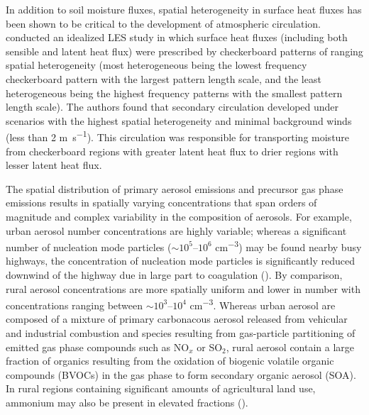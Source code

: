 In addition to soil moisture fluxes, spatial heterogeneity in surface heat fluxes has been shown to be critical to the development of atmospheric circulation. \cite{lee_effect_2019} conducted an idealized LES study in which surface heat fluxes (including both sensible and latent heat flux) were prescribed by checkerboard patterns of ranging spatial heterogeneity (most heterogeneous being the lowest frequency checkerboard pattern with the largest pattern length scale, and the least heterogeneous being the highest frequency patterns with the smallest pattern length scale). The authors found that secondary circulation developed under scenarios with the highest spatial heterogeneity and minimal background winds (less than 2 \si{m.s^{-1}}). This circulation was responsible for transporting moisture from checkerboard regions with greater latent heat flux to drier regions with lesser latent heat flux. 

The spatial distribution of primary aerosol emissions and precursor gas phase emissions results in spatially varying concentrations that span orders of magnitude and complex variability in the composition of aerosols. For example, urban aerosol number concentrations are highly variable; whereas a significant number of nucleation mode particles ($\sim10^5$--$10^6$ \si{cm^{-3}}) may be found nearby busy highways, the concentration of nucleation mode particles is significantly reduced downwind of the highway due in large part to coagulation (\cite{zhu_study_2002}). By comparison, rural aerosol concentrations are more spatially uniform and lower in number with concentrations ranging between $\sim10^3$--$10^4$ \si{cm^{-3}}. Whereas urban aerosol are composed of a mixture of primary carbonacous aerosol released from vehicular and industrial combustion and species resulting from gas-particle partitioning of emitted gas phase compounds such as NO$_x$ or SO$_2$, rural aerosol contain a large fraction of organics resulting from the oxidation of biogenic volatile organic compounds (BVOCs) in the gas phase to form secondary organic aerosol (SOA). In rural regions containing significant amounts of agricultural land use, ammonium may also be present in elevated fractions (\cite{seinfeld_atmospheric_1998}). 

